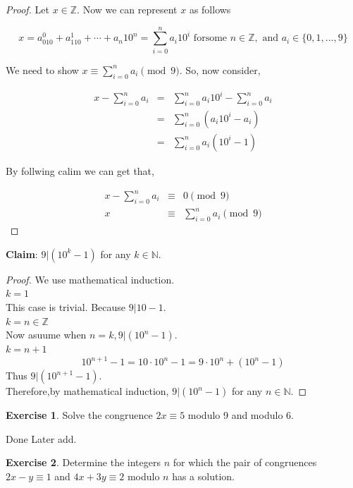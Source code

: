 \documentclass[
]{book}
\theoremstyle{definition}
\theoremstyle{definition}
\theoremstyle{definition}
\newtheorem{exercise}{Exercise}[chapter]
\theoremstyle{definition}
\theoremstyle{remark}
\begin{document}
\begin{proof}
Let \(x\in \mathbb{Z}\). Now we can represent \(x\) as follows

\[x=a_010^0+a_110^1+\cdots +a_n10^n=\sum_{i=0}^n a_{i}10^i\text{  forsome } n\in \mathbb{Z},\text{ and }a_i\in \{0,1,...,9\}\]

We need to show \(x \equiv \sum_{i=0}^na_i\pmod{9}\). So, now consider,

\begin{eqnarray}
x-\sum_{i=0}^n a_{i}&=&\sum_{i=0}^n a_{i}10^i-\sum_{i=0}^n a_{i}\\
&=& \sum_{i=0}^n (a_{i}10^i- a_{i})\\
&=& \sum_{i=0}^n a_{i}(10^i- 1)
\end{eqnarray}

By follwing calim we can get that,

\begin{eqnarray}
x-\sum_{i=0}^n a_i &\equiv & 0 \pmod{9}\\
x &\equiv & \sum_{i=0}^na_i\pmod{9}
\end{eqnarray}
\end{proof}

\textbf{Claim}: \(9|(10^k-1)\) for any \(k\in \mathbb{N}\).

\begin{proof}
We use mathematical induction.\\
\emph{\(k=1\)}\\
This case is trivial. Because \(9|10-1\).\\
\emph{\(k=n\in\mathbb{Z}\)}\\
Now asuume when \(n=k, 9|(10^n-1)\).\\
\emph{\(k=n+1\)}
\[10^{n+1}-1 =10\cdot 10^{n}-1=9\cdot 10^n + (10^n - 1) \]
Thus \(9\vert (10^{n+1}-1)\).\\
Therefore,by mathematical induction, \(9|(10^n-1)\) for any \(n\in \mathbb{N}\).
\end{proof}

\begin{exercise}
\protect\hypertarget{exr:unnamed-chunk-143}{}\label{exr:unnamed-chunk-143}Solve the congruence \(2x \equiv 5\) modulo 9 and modulo 6.
\end{exercise}

Done Later add.

\begin{exercise}
\protect\hypertarget{exr:unnamed-chunk-144}{}\label{exr:unnamed-chunk-144}Determine the integers \(n\) for which the pair of congruences \(2x - y \equiv 1\) and \(4x + 3y \equiv 2\) modulo \(n\) has a solution.
\end{exercise}
\end{document}
